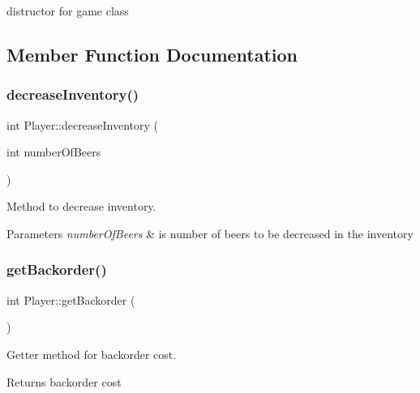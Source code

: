 distructor for game class 



\subsection{Member Function Documentation}
\mbox{\label{class_player_ae2197d1061a24fa444129b5ea85996d5}} 
\subsubsection{\texorpdfstring{decrease\+Inventory()}{decreaseInventory()}}
{\footnotesize\ttfamily int Player\+::decrease\+Inventory (\begin{DoxyParamCaption}\item[{int}]{number\+Of\+Beers }\end{DoxyParamCaption})}



Method to decrease inventory. 


\begin{DoxyParams}{Parameters}
{\em number\+Of\+Beers} & is number of beers to be decreased in the inventory \\
\hline
\end{DoxyParams}
\mbox{\label{class_player_a8080e44c26141d956babb824d2a7ae7c}} 
\subsubsection{\texorpdfstring{get\+Backorder()}{getBackorder()}}
{\footnotesize\ttfamily int Player\+::get\+Backorder (\begin{DoxyParamCaption}{ }\end{DoxyParamCaption})}



Getter method for backorder cost. 

\begin{DoxyReturn}{Returns}
backorder cost 
\end{DoxyReturn}
\mbox{\label{class_player_a3a1e9666f1da8750452296310ed95e1f}} 
